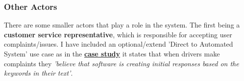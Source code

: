 \documentclass{article}
\begin{document}
    \subsubsection{Other Actors}
      There are some smaller actors that play a role in the system. The first being a \textbf{customer service representative}, which is responsible for accepting user
      complaints/issues. I have included an optional/extend 'Direct to Automated System' use case as in the \href{https://learn-eu-central-1-prod-fleet01-xythos.content.blackboardcdn.com/5d2cb9c32e9d7/4991549?X-Blackboard-Expiration=1653922800000&X-Blackboard-Signature=a2RnywjBpwblbDHmnp%2BXEpXu5N%2FFoCmkQs%2FBPlAAUAo%3D&X-Blackboard-Client-Id=163100&response-cache-control=private%2C%20max-age%3D21600&response-content-disposition=inline%3B%20filename%2A%3DUTF-8%27%27Reading1-Uber-CaseStudy%2520%25281%2529.hai.pdf&response-content-type=application%2Fpdf&X-Amz-Security-Token=IQoJb3JpZ2luX2VjEBgaDGV1LWNlbnRyYWwtMSJGMEQCIHIn%2BZn3gy3MjoPp7PH8o8SnEhgHocgjO0CPywLkcPIXAiAIwi1oSntPYzMUdrA%2FGVOy4wq4jKDGcCVfnD7ffXaIkSrcBAgREAIaDDYzNTU2NzkyNDE4MyIMbRXWMdMQ5uaeyu%2BXKrkEseD2PJmHV%2Fj1ElO5YaeFrgTrUJewyFaGJTLDptki%2Fw6Q%2Bfwo0H6dymEdL4rI6suCDdx2RwJxWKHNCDeFPFh15O0H6KG3qCcX%2FovlcsZ%2Bh499B6hJiMWnFXvUnuWaPcx%2BV6e01ECkcMfeo7brbj8ESEg6SQIJ1nX5BXlg7UtRDLXTosDkKcWx7v1BCND32q1UkRbr%2Bs5J4iZpddBWaxLUsea0LF%2BjlQiS8%2FXREUTvbtgPmNRLSuQAbM7KWHTnEZvsbWOvwSG8nkcbQE8yTiQFrpoRUuWYt33NAVg6HXxNAwqTHGcVA8nbiPt2bN%2FLjEt344CUJYG0gA35UCtYf3DR0PrCzbrV2pEVioy0%2FX9Kvvbv2h1WYHvGD1Q%2BvrXMhizyd2InWYiU1X4EeMC7Im1rHbYt0qo3RXKqZlzNxM%2F0zaNe0IRkbsGQJarkF5DP3bz7NeU188afhSfu7T6xYhAajAVrnGxhooCc3YI66br60NygfY2OAp2MeKI6dzNw0FdfsaA31f%2BZasU9n2aP3weV7AwZvaGMpGoXahuvjnJ9mKuWKc6HrWu8HPJhq7Wr3mOC9bd8YBDG2WzIrB9kM45iNQOTG67CMF5x7eXj4KNVntZgG63Jn%2BBxiVLgIxMR55%2BsA0IkQ9DXQoj0esQ2J3JBystYLTp79c5N5hB4iUr1w4i%2Fm20B1XVarZjUTObKPU%2FOhVMd2J0L3G3zBNVRH0el8n8UoO1L8s8M%2BITAhjLhoOO7%2BLkRlFfNmSUwpPvRlAY6qgH6gVLQCu8%2B4x1Gr4OZSSDIGJg8JceJGTGUuQTC4zObK%2FZFQf%2BCrgd5Yq9gmyB%2BAOERsBIpT6ovUVoNUY5CAx%2FHixZ6KneGKse3MAew4DX1G%2BVgC9yLWmgKAHtv0GZxfXyNshE3L9BSYbygxLiRZTj%2BEnF1Sb5WuM%2FANwhzfr%2Fv7xbJO8gk6ThTqegZJ%2FVz13WjTdieKNSwy4yyux01cLEanOenPhlqjOhSpg%3D%3D&X-Amz-Algorithm=AWS4-HMAC-SHA256&X-Amz-Date=20220530T090000Z&X-Amz-SignedHeaders=host&X-Amz-Expires=21600&X-Amz-Credential=ASIAZH6WM4PL5GS33QWA%2F20220530%2Feu-central-1%2Fs3%2Faws4_request&X-Amz-Signature=3bdd17adaf97b1927bdb8b06a7be5ddc78ca982d1660562cfa92729d6cdc622f}{\textbf{case study}}
      it states that when drivers make complaints they \textit{'believe that software is creating initial responses based on the keywords in their text'}.
\end{document}
